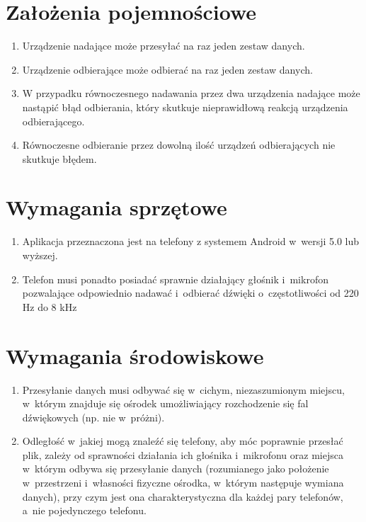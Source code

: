\documentclass{article}
\begin{document}
\section{Założenia pojemnościowe}
    \begin{enumerate}
        \item Urządzenie nadające może przesyłać na raz jeden zestaw danych.
        \item Urządzenie odbierające może odbierać na raz jeden zestaw danych.
        \item W przypadku równoczesnego nadawania przez dwa urządzenia nadające 
              może nastąpić błąd odbierania, który skutkuje nieprawidłową reakcją
              urządzenia odbierającego.
        \item Równoczesne odbieranie przez dowolną ilość urządzeń odbierających 
              nie skutkuje błędem.
    \end{enumerate}
        
\section{Wymagania sprzętowe}
    \begin{enumerate}
        \item Aplikacja przeznaczona jest na telefony z systemem Android w~wersji
              5.0 lub wyższej.
        \item Telefon musi ponadto posiadać sprawnie działający głośnik i~mikrofon
              pozwalające odpowiednio nadawać i~odbierać dźwięki o~częstotliwości
              od 220 Hz do 8 kHz
    \end{enumerate}
        
\section{Wymagania środowiskowe}
    \begin{enumerate}
        \item Przesyłanie danych musi odbywać się w~cichym, niezaszumionym miejscu, 
              w~którym znajduje się ośrodek umożliwiający rozchodzenie się fal 
              dźwiękowych (np. nie w~próżni).
        \item Odległość w~jakiej mogą znaleźć się telefony, aby móc poprawnie 
              przesłać plik, zależy od sprawności działania ich głośnika i~mikrofonu
              oraz miejsca w~którym odbywa się przesyłanie danych (rozumianego 
              jako położenie w~przestrzeni i~własności fizyczne ośrodka, w~którym
              następuje wymiana danych), przy czym jest ona charakterystyczna 
              dla każdej pary telefonów, a~nie pojedynczego telefonu.
    \end{enumerate}
\end{document}
